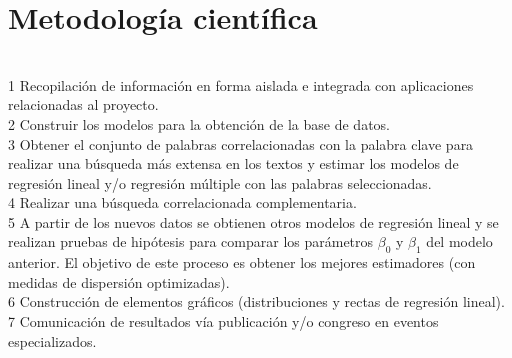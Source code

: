 \section {Metodología científica}
\ \\
1 Recopilación de información en forma aislada e integrada con aplicaciones relacionadas al proyecto.\\
2 Construir los modelos para la obtención de la base de datos.\\
3 Obtener el conjunto de palabras correlacionadas con la palabra clave para realizar una búsqueda más extensa en los textos y estimar los modelos de regresión lineal y/o regresión múltiple con las palabras seleccionadas.\\
4 Realizar una búsqueda correlacionada complementaria.\\
5 A partir de los nuevos datos se obtienen otros modelos de regresión lineal y se realizan pruebas de hipótesis para comparar los parámetros $\beta_0$ y $\beta_1$ del modelo anterior. El objetivo de este proceso es obtener los mejores estimadores (con medidas de dispersión optimizadas).\\
6 Construcción de elementos gráficos (distribuciones y rectas de regresión lineal).\\
7 Comunicación de resultados vía publicación y/o congreso en eventos especializados.